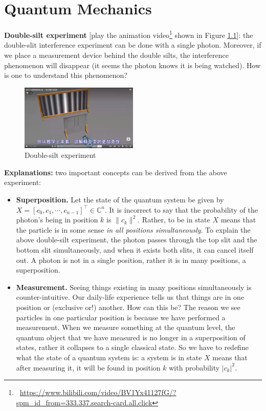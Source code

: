 \documentclass{easyclass}
\begin{document}
\else
	\chapter{Quantum Mechanics}
\fi

\textbf{Double-silt experiment} [play the animation video\footnote{\ \url{https://www.bilibili.com/video/BV1Yx41127fG/?spm_id_from=333.337.search-card.all.click}} shown in Figure \ref{fig:double silt experiment}]:  the double-slit interference experiment can be done with a single photon. Moreover, if we place a measurement device behind the double silts, the interference phenomenon will disappear (it seems the photon knows it is being watched). How is one to understand this phenomenon?

\begin{figure}[h]
	\centering
	\includegraphics[width=0.5\textwidth]{figures/double-silt-experiment.png}
	\caption{Double-silt experiment}
	\label{fig:double silt experiment}
\end{figure}

\textbf{Explanations:} two important concepts can be derived from the above experiment:
\begin{itemize}
	\item \textbf{Superposition.} Let the state of the quantum system be given by $X = [c_0, c_1, \cdots ,c_{n-1}]^{\top} \in \mathbb{C}^n$. It is incorrect to say that the probability of the photon’s being in position $k$ is $\|c_k\|^2$. Rather, to be in state $X$ means that the particle is in some sense \textit{in all positions simultaneously}. To explain the above double-silt experiment, the photon passes through the top slit and the bottom slit simultaneously, and when it exists both slits, it can cancel itself out. A photon is not in a single position, rather it is in many positions, a superposition.
	
	\item \textbf{Measurement.} Seeing things existing in many positions simultaneously is counter-intuitive. Our daily-life experience tells us that things are in one
	position or (exclusive or!) another. How can this be? The reason we see particles
	in one particular position is because we have performed a measurement. When we
	measure something at the quantum level, the quantum object that we have measured is no longer in a superposition of states, rather it collapses to a single classical state. So we have to redefine what the state of a quantum system is: a system is in state $X$ means that after measuring it, it will be found in position $k$ with probability $|c_k|^2$.
\end{itemize}
\end{document}
